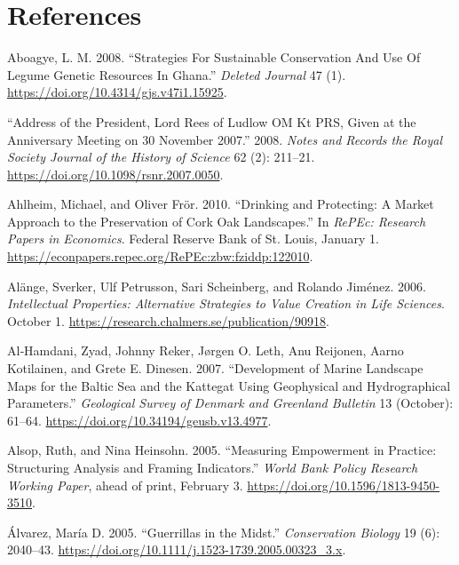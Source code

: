 \section{References}\label{references}

\protect{}\label{refs}
\begin{CSLReferences}{1}{1}
Aboagye, L. M. 2008. {``Strategies For Sustainable Conservation And Use
Of Legume Genetic Resources In Ghana.''} \emph{Deleted Journal} 47 (1).
\url{https://doi.org/10.4314/gjs.v47i1.15925}.

{``Address of the President, Lord Rees of Ludlow OM Kt PRS, Given at the
Anniversary Meeting on 30 November 2007.''} 2008. \emph{Notes and
Records the Royal Society Journal of the History of Science} 62 (2):
211--21. \url{https://doi.org/10.1098/rsnr.2007.0050}.

Ahlheim, Michael, and Oliver Frör. 2010. {``Drinking and Protecting: A
Market Approach to the Preservation of Cork Oak Landscapes.''} In
\emph{RePEc: Research Papers in Economics}. Federal Reserve Bank of St.
Louis, January 1.
\url{https://econpapers.repec.org/RePEc:zbw:fziddp:122010}.

Alänge, Sverker, Ulf Petrusson, Sari Scheinberg, and Rolando Jiménez.
2006. \emph{Intellectual Properties: Alternative Strategies to Value
Creation in Life Sciences}. October 1.
\url{https://research.chalmers.se/publication/90918}.

Al‐Hamdani, Zyad, Johnny Reker, Jørgen O. Leth, Anu Reijonen, Aarno
Kotilainen, and Grete E. Dinesen. 2007. {``Development of Marine
Landscape Maps for the Baltic Sea and the Kattegat Using Geophysical and
Hydrographical Parameters.''} \emph{Geological Survey of Denmark and
Greenland Bulletin} 13 (October): 61--64.
\url{https://doi.org/10.34194/geusb.v13.4977}.

Alsop, Ruth, and Nina Heinsohn. 2005. {``Measuring Empowerment in
Practice: Structuring Analysis and Framing Indicators.''} \emph{World
Bank Policy Research Working Paper}, ahead of print, February 3.
\url{https://doi.org/10.1596/1813-9450-3510}.

Álvarez, María D. 2005. {``Guerrillas in the Midst.''}
\emph{Conservation Biology} 19 (6): 2040--43.
\url{https://doi.org/10.1111/j.1523-1739.2005.00323_3.x}.


\end{CSLReferences}
